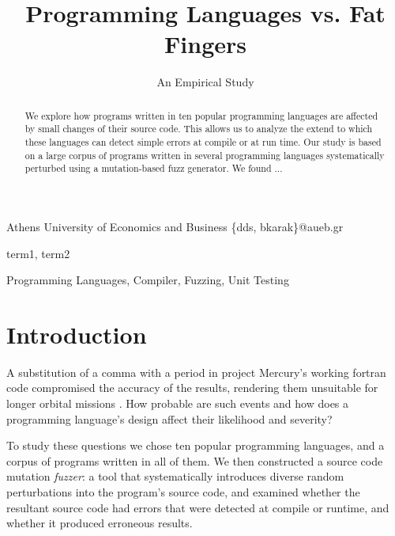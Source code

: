 \documentclass[10pt]{sigplanconf}
\begin{document}
\copyrightdata{[to be supplied]}


\title{Programming Languages vs. Fat Fingers}
\subtitle{An Empirical Study}

  {Athens University of Economics and Business}
  {\{dds, bkarak\}@aueb.gr}

\maketitle

\begin{abstract}
We explore how programs written in ten popular programming languages
are affected by small changes of their source code.
This allows us to analyze the extend to which these languages
can detect simple errors at compile or at run time.
Our study is based on a large corpus of programs written in several programming
languages systematically perturbed using a mutation-based fuzz generator.
We found ... %
\end{abstract}


\terms
term1, term2

\keywords
Programming Languages, Compiler, Fuzzing, Unit Testing

\section{Introduction} %
A substitution of a comma with a period in project Mercury's working
{\sc fortran} code compromised the accuracy of the results,
rendering them unsuitable for longer orbital missions \cite{Brad89,Neu95}.
How probable are such events and how does a programming language's
design affect their likelihood and severity?

To study these questions we chose ten popular programming languages,
and a corpus of programs written in all of them.
We then constructed a source code mutation {\em fuzzer}:
a tool that systematically introduces diverse random perturbations
into the program's source code,
and examined whether the resultant source code had errors that
were detected at compile or runtime, and whether it produced
erroneous results.
\end{document}
